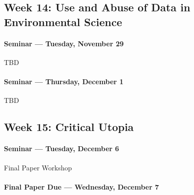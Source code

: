     \subsection{\textbf{Week 14}: Use and Abuse of Data in Environmental Science}
    
    \paragraph{Seminar --- Tuesday, November 29}
    
    \begin{itemize*}
    \item TBD
    \end{itemize*}	
    

    \paragraph{Seminar --- Thursday, December 1}
    
    \begin{itemize*}
    \item TBD
    \end{itemize*}
    
    
    \subsection{\textbf{Week 15}: Critical Utopia}
    
    \paragraph{Seminar --- Tuesday, December 6}
    
\begin{itemize*}
  \item Final Paper Workshop
\end{itemize*}

    \paragraph{Final Paper Due --- Wednesday, December 7}   
   